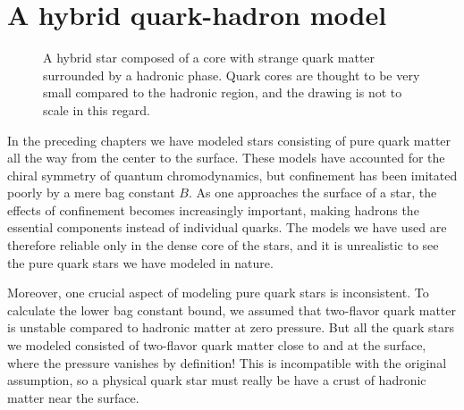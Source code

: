 \chapter{A hybrid quark-hadron model}
\label{chap:hybrid}

\begin{figure}[th!]
\centering
{}
\caption{\label{fig:hybrid:illustration}%
	A hybrid star composed of a core with strange quark matter surrounded by a hadronic phase.
	Quark cores are thought to be very small compared to the hadronic region, and the drawing is not to scale in this regard.
}
\end{figure}

In the preceding chapters we have modeled stars consisting of pure quark matter all the way from the center to the surface.
These models have accounted for the chiral symmetry of quantum chromodynamics,
but confinement has been imitated poorly by a mere bag constant $B$.
As one approaches the surface of a star,
the effects of confinement becomes increasingly important,
making hadrons the essential components instead of individual quarks.
The models we have used are therefore reliable only in the dense core of the stars,
and it is unrealistic to see the pure quark stars we have modeled in nature.

Moreover, one crucial aspect of modeling pure quark stars is inconsistent.
To calculate the lower bag constant bound, we assumed that two-flavor quark matter is unstable compared to hadronic matter at zero pressure.
But all the quark stars we modeled consisted of two-flavor quark matter close to and at the surface,
where the pressure vanishes by definition!
This is incompatible with the original assumption,
so a physical quark star must really be have a crust of hadronic matter near the surface.

